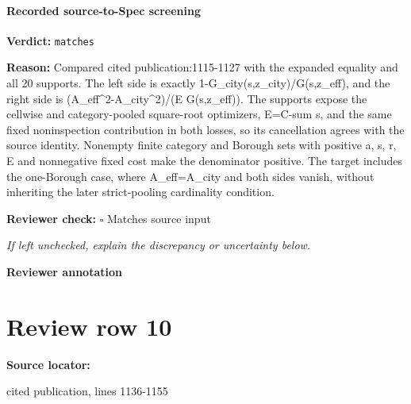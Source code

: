 \documentclass[10pt]{article}
\newcommand{\reviewerbox}{%
  \par\noindent\fbox{\parbox{0.96\linewidth}{\rule{0pt}{0.38in}}}\par
}
\newcommand{\reviewmatch}[1]{%
  \par\noindent\textbf{Reviewer check:} $\square$\; #1\par
  \noindent\emph{If left unchecked, explain the discrepancy or uncertainty below.}\par
}
\begin{document}
\paragraph{Recorded source-to-Spec screening}
\textbf{Verdict:} \texttt{matches}
\\
{\raggedright
\textbf{Reason:} Compared cited publication:\allowbreak{}1115-\allowbreak{}1127 with the expanded equality and all 20 supports.\allowbreak{} The left side is exactly 1-\allowbreak{}G\_\allowbreak{}city(s,z\_\allowbreak{}city)/\allowbreak{}G(s,z\_\allowbreak{}eff), and the right side is (A\_\allowbreak{}eff\textasciicircum{}2-\allowbreak{}A\_\allowbreak{}city\textasciicircum{}2)/\allowbreak{}(E G(s,z\_\allowbreak{}eff)).\allowbreak{} The supports expose the cellwise and category-\allowbreak{}pooled square-\allowbreak{}root optimizers, E=C-\allowbreak{}sum s, and the same fixed noninspection contribution in both losses, so its cancellation agrees with the source identity.\allowbreak{} Nonempty finite category and Borough sets with positive a, s, r, E and nonnegative fixed cost make the denominator positive.\allowbreak{} The target includes the one-\allowbreak{}Borough case, where A\_\allowbreak{}eff=A\_\allowbreak{}city and both sides vanish, without inheriting the later strict-\allowbreak{}pooling cardinality condition.\allowbreak{}
\par}
\reviewmatch{Matches source input}
\noindent\textbf{Reviewer annotation}\par
\reviewerbox
\clearpage
\hypertarget{source-claim-4c2c36cb660fbed8}{}
\section*{Review row 10}
\textbf{Source locator:} {\footnotesize\raggedright cited publication, lines 1136-\allowbreak{}1155\par}
\end{document}
